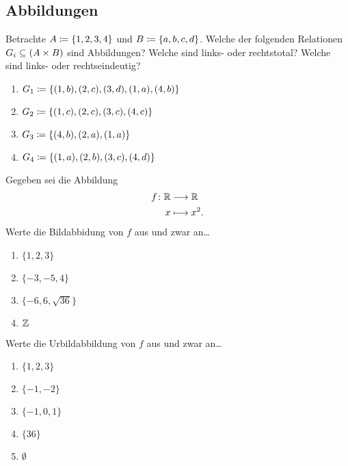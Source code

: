 \subsection{Abbildungen}


\begin{aufg}

  Betrachte $A\coloneqq\{1,2,3,4\}$ und $B\coloneqq\{a,b,c,d\}$. Welche der folgenden
  Relationen $G_{i}\subseteq (A\times B)$ sind Abbildungen? Welche sind links- oder
  rechtstotal? Welche sind links- oder rechtseindeutig?
  \begin{enumerate}
    \item $G_{1}\coloneqq \{ (1,b) , (2,c), (3,d), (1,a), (4,b) \}$
    \item $G_{2}\coloneqq \{ (1,c) , (2,c), (3,c), (4,c) \}$
    \item $G_{3}\coloneqq \{ (4,b) , (2,a), (1,a) \}$
    \item $G_{4}\coloneqq \{ (1,a) , (2,b), (3,c), (4,d) \}$
  \end{enumerate}
  
\end{aufg}


\begin{aufg}
  Gegeben sei die Abbildung
  \begin{align*}
    f\colon\mathbb R&\longrightarrow\mathbb R \\
    x&\longmapsto x^{2}.
  \end{align*}
  Werte die Bildabbidung von $f$ aus und zwar an\dots
  \begin{enumerate}
    \item $\{ 1,2,3 \}$
    \item $\{ -3,-5,4 \}$
    \item $\{ -6, 6, \sqrt{36} \}$
    \item $\mathbb Z$
  \end{enumerate}
  Werte die Urbildabbildung von $f$ aus und zwar an\dots
  \begin{enumerate}
    \item $\{ 1,2,3 \}$
    \item $\{ -1,-2 \}$
    \item $\{ -1,0,1 \}$
    \item $\{ 36 \}$
    \item $\emptyset$
  \end{enumerate}
\end{aufg}


